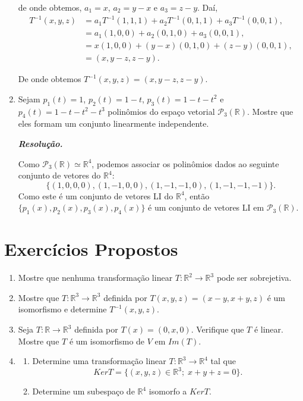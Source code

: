 \begin{enumerate}
de  onde obtemos, $a_1=x$, $ a_2=y-x$ e $a_3=z-y$.  Daí,
\begin{align*}
T^{-1}(x,y,z)&= a_1T^{-1}(1,1,1)+a_2T^{-1} (0,1,1)+a_3T^{-1} (0,0,1),\\
&= a_1(1,0,0)+a_2 (0,1,0)+a_3 (0,0,1),\\
&=x(1,0,0)+(y-x) (0,1,0)+(z-y) (0,0,1),\\
&=(x,y-z, z-y).
\end{align*}

De onde obtemos $T^{-1}(x,y,z)=(x,y-z, z-y)$.

\item Sejam $p_1(t)=1$, $p_2(t)=1-t$, $p_3(t)=1-t-t^2$ e $p_4(t)=1-t-t^2-t^3$ polinômios do espaço vetorial $\mathcal{P}_3(\mathbb{R})$. Mostre que eles formam um conjunto linearmente independente.

\textbf{\textit{Resolução.} }

Como $\mathcal{P}_3(\mathbb{R}) \simeq \mathbb{R}^4$,  podemos associar os polinômios dados ao seguinte conjunto de vetores do $\mathbb{R}^4$: $$\{(1,0,0,0), (1,-1,0,0),(1,-1,-1,0), (1,-1,-1,-1)\}.$$
Como este é um conjunto de vetores LI do $\mathbb{R}^4$, então $\{p_1(x), p_2(x), p_3(x), p_4(x)\}$ é um conjunto de vetores LI em  $\mathcal{P}_3(\mathbb{R}) $.


\end{enumerate}

\section{Exercícios Propostos}
\begin{enumerate}
\item Mostre que nenhuma transformação linear   $T: \mathbb{R}^2 \rightarrow \mathbb{R}^3$ pode ser sobrejetiva.

\item Mostre que $T: \mathbb{R}^3 \rightarrow \mathbb{R}^3$ definida por $T(x,y,z)=(x-y, x+y, z)$ é um isomorfismo e determine $T^{-1}(x,y,z)$.

\item Seja $T: \mathbb{R} \rightarrow \mathbb{R}^3$ definida por $T(x)=(0,x,0)$. Verifique que $T$ é linear. Mostre que $T$ é um isomorfismo de $V$ em $Im(T)$.

\item
\begin{enumerate}
\item Determine uma transformação linear $T:\mathbb{R}^3 \rightarrow \mathbb{R}^4$ tal que $$KerT=\{(x,y,z) \in \mathbb{R}^3; \; x+y+z=0\}.$$
\item Determine um subespaço de $\mathbb{R}^4$ isomorfo  a $KerT$.
\end{enumerate}

\end{enumerate}

